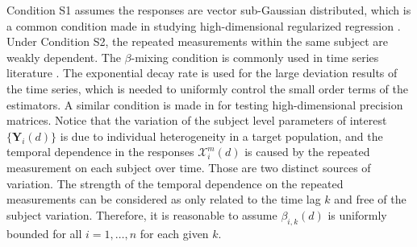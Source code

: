 \documentclass[12pt]{article}
\numberwithin{equation}{section}
\newcommand{\bX}{{\mathbf X}}
\newcommand{\bY}{{\mathbf Y}}
\begin{document}

Condition S1 assumes the responses are vector sub-Gaussian distributed, which is a common condition made in studying high-dimensional 
regularized regression \citep{vanderGeerRitov2014, Ning17}. %
Under Condition S2, the repeated measurements within the same subject are weakly dependent.
The $\beta$-mixing condition is commonly used in time series literature \citep{bradley2005basic}. 
The exponential decay rate is used for the large deviation results of the time series, which is needed to uniformly control the small order terms of the estimators.
A similar condition is made in \cite{ChangQiuYao_2016} for testing high-dimensional precision matrices. 
Notice that the variation of the subject level parameters of interest $\{\bY_{i}(d)\}$ is due to 
individual heterogeneity in a target population, and the temporal dependence in the responses $\mathcal{X}_i^m(d)$ is caused by the repeated measurement on each subject over time. 
Those are two distinct sources of variation. The strength of the temporal dependence on the repeated measurements can be considered as only related to the time lag $k$ and free of the subject variation.
Therefore, it is reasonable to assume $\beta_{i, k}(d)$ is uniformly bounded for all $i = 1, \ldots, n$ for each given $k$.
\end{document}
